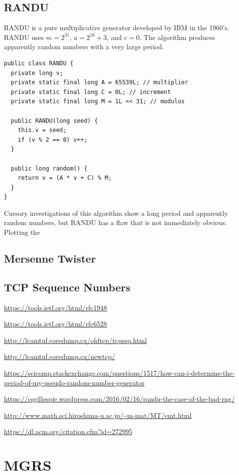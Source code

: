 \documentclass{book}
\begin{document}
\section{RANDU}

RANDU is a pure multiplicative generator developed by IBM in the 1960's. RANDU uses $m=2^{31}$, $a=2^{16}+3$, and $c=0$. The algorithm produces apparently random numbers with a very large period.

\begin{lstlisting}[caption={The RANDU PRNG implemented in Java}]
public class RANDU {
  private long v;
  private static final long A = 65539L; // multiplier
  private static final long C = 0L; // increment
  private static final long M = 1L << 31; // modulus

  public RANDU(long seed) {
    this.v = seed;
    if (v % 2 == 0) v++;
  }

  public long random() {
    return v = (A * v + C) % M;
  }
}
\end{lstlisting}

Cursory investigations of this algorithm show a long period and apparently random numbers, but RANDU has a flaw that is not immediately obvious. Plotting the 

\section{Mersenne Twister}



\section{TCP Sequence Numbers}


\url{https://tools.ietf.org/html/rfc1948}

\url{https://tools.ietf.org/html/rfc6528}

\url{http://lcamtuf.coredump.cx/oldtcp/tcpseq.html}

\url{http://lcamtuf.coredump.cx/newtcp/}

\url{https://scicomp.stackexchange.com/questions/1517/how-can-i-determine-the-period-of-my-pseudo-random-number-generator}

\url{https://csgillespie.wordpress.com/2016/02/16/randu-the-case-of-the-bad-rng/}

\url{http://www.math.sci.hiroshima-u.ac.jp/~m-mat/MT/emt.html}

\url{https://dl.acm.org/citation.cfm?id=272995}

\chapter{MGRS}
\end{document}
